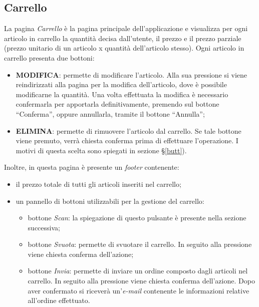 \documentclass[12pt, a4paper, titlepage]{report}
\begin{document}
	\subsection{Carrello}
	La pagina \textit{Carrello} è la pagina principale dell'applicazione e visualizza per ogni articolo in carrello la quantità decisa dall'utente, il prezzo e il prezzo parziale (prezzo unitario di un articolo x quantità dell'articolo stesso). Ogni articolo in carrello presenta due bottoni: 
	\begin{itemize}
		\item \textbf{MODIFICA}: permette di modificare l'articolo. Alla sua pressione si viene reindirizzati alla pagina per la modifica dell'articolo, dove è possibile modificarne la quantità. Una volta effettuata la modifica è necessario confermarla per apportarla definitivamente, premendo sul bottone ``Conferma'', oppure annullarla, tramite il bottone ``Annulla'';
		\item \textbf{ELIMINA}: permette di rimuovere l'articolo dal carrello. Se tale bottone viene premuto, verrà chiesta conferma prima di effettuare l'operazione. I motivi di questa scelta sono spiegati in sezione §\ref{butt}).
	\end{itemize}
	Inoltre, in questa pagina è presente un \textit{footer} contenente:
	\begin{itemize}
		\item il prezzo totale di tutti gli articoli inseriti nel carrello;
		\item un pannello di bottoni utilizzabili per la gestione del carrello:
		\begin{itemize}
			\item bottone \textit{Scan}: la spiegazione di questo pulsante è presente nella sezione successiva;
			\item bottone \textit{Svuota}: permette di svuotare il carrello. In seguito alla pressione viene chiesta conferma dell'azione;
			\item bottone \textit{Invia}: permette di inviare un ordine composto dagli articoli nel carrello. In seguito alla pressione viene chiesta conferma dell'azione. Dopo aver confermato si riceverà un'\textit{e-mail} contenente le informazioni relative all'ordine effettuato.
		\end{itemize}
	\end{itemize} 
	
\end{document}
